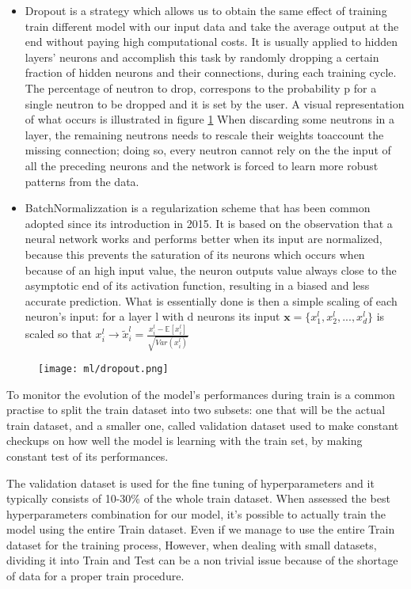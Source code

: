 \documentclass[a4paper,11pt]{article}
\begin{document}
\begin{itemize}
\item Dropout is a strategy which allows us to obtain the same effect of training train different model with our input data and take the average output at the end without paying high computational costs.
It is usually applied to hidden layers' neurons and accomplish this task by randomly dropping a certain fraction of hidden neurons and their connections, during each training cycle. The percentage of neutron to drop, correspons to the probability p for a single neutron to be dropped and it is set by the user.
A visual representation of what occurs is illustrated in figure \ref{fig:dropout}
When discarding some neutrons in a layer, the remaining neutrons needs to rescale their weights toaccount the missing connection; doing so, every neutron cannot rely on the the input of all the preceding neurons and the network is forced to learn more robust patterns from the data.
\item BatchNormalizzation is a regularization scheme that has been common adopted since its introduction in 2015. It is based on the observation that  a neural network works and performs better when its input are normalized, because this prevents the saturation of its neurons which occurs when because of an high input value, the neuron outputs value always close to the asymptotic end of its activation function, resulting in a biased and less accurate prediction.
What is essentially done is then a simple scaling of each neuron's input: for a layer l with d neurons its input $\mathbf{x} = \{x_1^l, x_2^l, ..., x_d^l\}$ is scaled so that $x_i^l \rightarrow \tilde x_i^l = \frac{x_i^{l} - \mathbb{E}[x_i^l]}{\sqrt{Var(x_i^l)}} $

\end{itemize}

\begin{figure}
\texttt{[image: ml/dropout.png]}
\caption{}
\label{fig:dropout}
\end{figure}


To monitor the evolution of the model's performances during train is a common practise to split the train dataset into two subsets: one that will be the actual train dataset, and a smaller one, called validation dataset used to make constant checkups on how well the model is learning with the train set, by making constant test of its performances.

The validation dataset is used for the fine tuning of hyperparameters and it typically consists of 10-30\% of the whole train dataset.
When assessed the best hyperparameters combination for our model, it's possible to actually train the model using the entire Train dataset.
Even if we manage to use the entire Train dataset for the training process,
However, when dealing with small datasets, dividing it into Train and Test can be a non trivial issue because of the shortage of data for a proper train procedure.
\end{document}
